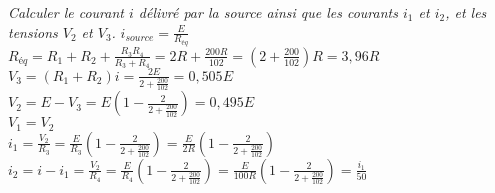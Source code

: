 \Question
{%
\textit{Calculer le courant $i$ délivré par la source ainsi que les courants $i_1$ et $i_2$, et les tensions $V_2$ et $V_3$.}
}
{%
$i_{source}=\frac{E}{R_{éq}}$\\
$R_{éq}=R_1+R_2+\frac{R_3 R_4}{R_3+R_4}=2R+\frac{200R}{102}=(2+\frac{200}{102})R=3,96R$\\
$V_3=(R_1+R_2)i=\frac{2E}{2+\frac{200}{102}}=0,505E$\\
$V_2=E-V_3=E(1-\frac{2}{2+\frac{200}{102}})=0,495E$\\
$V_1=V_2$\\
$i_1=\frac{V_2}{R_3}=\frac{E}{R_3}(1-\frac{2}{2+\frac{200}{102}})=\frac{E}{2R}(1-\frac{2}{2+\frac{200}{102}})$\\
$i_2=i-i_1=\frac{V_2}{R_4}=\frac{E}{R_4}(1-\frac{2}{2+\frac{200}{102}})=\frac{E}{100R}(1-\frac{2}{2+\frac{200}{102}})=\frac{i_1}{50}$
}
